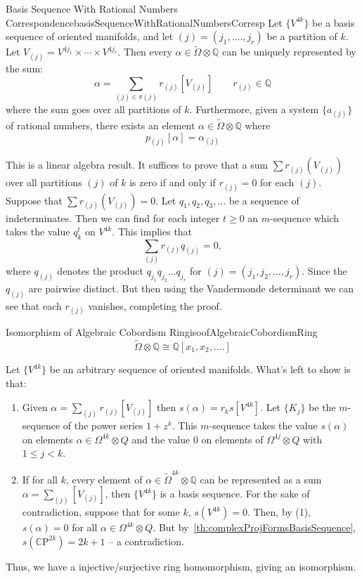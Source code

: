 \documentclass{book}
\newenvironment{Proof}[1][]
  {\begin{ProofTcb}[#1]}
  {\end{ProofTcb}}
\newcommand{\Q}{{\mathbb{Q}}}
\newcommand{\CP}{{\mathbb{C}\mathrm{P}}}
\begin{document}
\begin{thm}{Basis Sequence With Rational Numbers Correspondence}{basisSequenceWithRationalNumbersCorresp}
  Let $\{V^{4k}\}$ be a basis sequence of oriented manifolds, and let $(j) = (j_1, ...., j_r)$ be a partition
  of $k$. Let $V_{(j)} = V^{4j_1}\times \cdots \times V^{4j_r}$. Then every $\alpha \in
  \widetilde{\Omega}\otimes \Q$ can be uniquely represented by the sum:
  \[
    \alpha = \sum_{(j) \in \pi(j)} r_{(j)}[V_{(j)}] \qquad r_{(j)} \in \Q
  \]
  where the sum goes over all partitions of $k$. Furthermore, given a system $\{a_{(j)}\}$ of rational
  numbers, there exists an element $\alpha \in \widetilde{\Omega}\otimes \Q$ where
  \[
    p_{(j)}[\alpha] = \alpha_{(j)}
  \]
\end{thm}
\begin{Proof}
  This is a linear algebra result. It suffices to prove that a sum $\sum
  r_{(j)}(V_{(j)})$ over all partitions $(j)$ of $k$ is zero if and only if $r_{(j)} = 0$ for each $(j)$.
  Suppose that $\sum r_{(j)}(V_{(j)}) = 0$. Let $q_1, q_2, q_3, \ldots$ be a sequence of indeterminates. Then
  we can find for each integer $t \geq 0$ an $m$-sequence which takes the value $q_k^t$ on
  $V^{4k}$. This implies that
\[
    \sum_{(j)} r_{(j)} q_{(j)} = 0,
\]
where $q_{(j)}$ denotes the product $q_{j_1} q_{j_2} \ldots q_{j_r}$ for $(j) = (j_1, j_2, \ldots, j_r)$.
Since the $q_{(j)}$ are pairwise distinct. But then using the Vandermonde determinant we can see that each
$r_{(j)}$ vanishes, completing the proof.
\end{Proof}



\begin{thm}{Isomorphism of Algebraic Cobordism Ring}{isoofAlgebraicCobordismRing}
  \[
    \widetilde{\Omega}\otimes \Q \cong \Q[x_1, x_2, ....]
  \]
\end{thm}

\begin{Proof}
  Let $\{V^{4k}\}$ be an arbitrary sequence of oriented manifolds. What's left to show is that:
  \begin{enumerate}
    \item Given $\alpha = \sum_{(j)} r_{(j)}[V_{(j)}]$ then $s(\alpha) = r_ks[V^{4k}]$. Let $\{K_j\}$ be the
      $m$-sequence of the power series $1 + z^k$. This $m$-sequence takes the value $s(\alpha)$ on elements
      $\alpha \in \Omega^{4k} \otimes Q$ and the value $0$ on elements of $\Omega^{4j} \otimes Q$ with $1 \leq
      j < k$.
    \item If for all $k$, every element of $\alpha \in \widetilde{\Omega}^{4k} \otimes \Q$ can be represented
      as a sum $\alpha = \sum_{(j)}[V_{(j)}]$, then $\{V^{4k}\}$ is a basis sequence. For the sake of contradiction, suppose that for
      some $k$, $s(V^{4k}) = 0$. Then, by (1), $s(\alpha) = 0$ for all $\alpha \in \Omega^{4k} \otimes Q$. But
      by~\cref{th:complexProjFormsBasisSequence}, $s(\CP^{2k}) = 2k + 1$ -- a contradiction.
  \end{enumerate}
  Thus, we have a injective/surjective ring homomorphism, giving an isomorphism.
\end{Proof}
\end{document}
